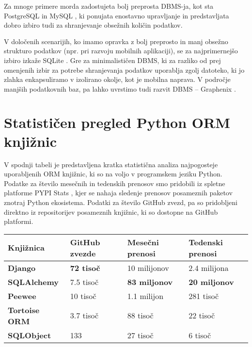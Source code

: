 \documentclass[a4paper,12pt,openright]{book}
\begin{document}
    Za mnoge primere morda zadostujeta bolj preprosta DBMS-ja, kot sta PostgreSQL \cite{POSTGRESQL} in MySQL \cite{MYSQL}, ki ponujata enostavno upravljanje in predstavljata dobro izbiro tudi za shranjevanje obsežnih količin podatkov. 
    
    V določenih scenarijih, ko imamo opravka z bolj preprosto in manj obsežno strukturo podatkov (npr. pri razvoju mobilnih aplikaciji), se za najprimernejšo izbiro izkaže SQLite \cite{SQLITE}. Gre za minimalističen DBMS, ki za razliko od prej omenjenih izbir za potrebe shranjevanja podatkov uporablja zgolj datoteko, ki jo zlahka enkapsuliramo v izolirano okolje, kot je mobilna naprava. V področje manjših podatkovnih baz, pa lahko uvrstimo tudi razvit DBMS – Graphenix \cite{GRAPHENIX_GITHUB}.
    
    \section{Statističen pregled Python ORM knjižnic}

    V spodnji tabeli je predstavljena kratka statistična analiza najpogosteje uporabljenih ORM knjižnic, ki so na voljo v programskem jeziku Python. Podatke za število mesečnih in tedenskih prenosov smo pridobili iz spletne platforme PYPI Stats \cite{pypistats}, kjer se nahaja sledenje prenosov posameznih paketov znotraj Python ekosistema. Podatki za število GitHub zvezd, pa so pridobljeni direktno iz repositorijev posameznih knjižnic, ki so dostopne na GitHub platformi.
    
    \noindent
    \begin{center}
        \begin{tabular}{p{}|p{}|p{}|p{}}
          {\bf Knjižnica} & {\bf GitHub zvezde} & {\bf Mesečni prenosi} & {\bf Tedenski prenosi} \\ \hline
          {\bf Django \cite{DJANGO_GITHUB}} & \textbf{\num{72} tisoč} & \num{10} milijonov & \num{2,4} milijona \\
          {\bf SQLAlchemy \cite{SQLALCHEMY_GITHUB}} & \num{7,5} tisoč &  \textbf{\num{83} miljonov} & \textbf{\num{20} miljonov} \\
          {\bf Peewee \cite{PEEWEE_GITHUB}} & \num{10} tisoč & \num{1,1} milijon & \num{281} tisoč \\
          {\bf Tortoise ORM \cite{TORTOISE_GITHUB}} & \num{3,7} tisoč & \num{88} tisoč & \num{22} tisoč \\
          {\bf SQLObject \cite{SQLOBJECT_GITHUB}} & 133 & \num{27} tisoč & \num{6} tisoč \\
        \end{tabular}
    \end{center}
\end{document}
